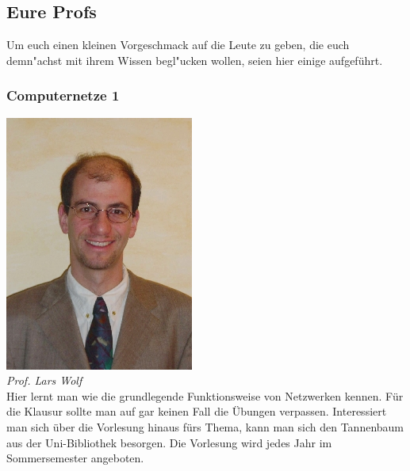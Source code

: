 \subsection{Eure Profs}
Um euch einen kleinen Vorgeschmack auf die Leute zu geben, die euch
demn"achst mit ihrem Wissen begl"ucken wollen, seien hier einige
aufgeführt. 

\subsubsection{Computernetze 1}

\includegraphics[width=0.7\linewidth]{bilder/dozenten/wolf}\\
\textit{Prof. Lars Wolf}\\
Hier lernt man wie die grundlegende Funktionsweise von Netzwerken
kennen. Für die Klausur sollte man auf gar keinen Fall die Übungen
verpassen. Interessiert man sich über die Vorlesung hinaus fürs Thema,
kann man sich den Tannenbaum aus der Uni-Bibliothek besorgen.
Die Vorlesung wird jedes Jahr im Sommersemester angeboten.


